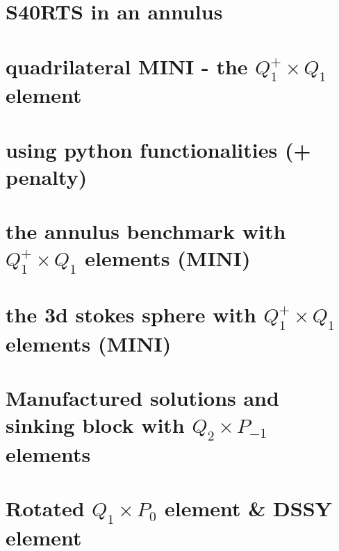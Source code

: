 \documentclass[a4paper,11pt]{report}
\begin{document}
\chapter{S40RTS in an annulus \label{f71}} %

\chapter{quadrilateral MINI - the $Q_1^+\times Q_1$ element \label{f72}} %

\chapter{using python functionalities (\QonePzero + penalty)\label{f73}} %

\chapter{the annulus benchmark with $Q_1^+\times Q_1$ elements (MINI) \label{f74}} %

\chapter{the 3d stokes sphere with $Q_1^{+}\times Q_1$ elements (MINI) \label{f75}} %

\chapter{Manufactured solutions and sinking block with $Q_2\times P_{-1}$ elements \label{f76}} %

\chapter{Rotated $Q_1\times P_0$ element \& DSSY element \label{f77}} %
\end{document}
